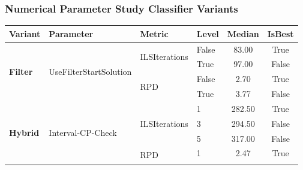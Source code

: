 \subsubsection{Numerical Parameter Study Classifier Variants}
\begin{table}[!ht]
	\tiny
	\centering
	\renewcommand{\multirowsetup}{\centering}
	\begin{tabular}{@{}l l l l c c @{}}
		\toprule
		\textbf{Variant}                      & \textbf{Parameter}                           & \textbf{Metric}                     & \textbf{Level}       & \textbf{Median} & \textbf{IsBest} \\
		\midrule
		\multirow[t]{4}{*}{\textbf{Filter}}   & \multirow[t]{4}{*}{UseFilterStartSolution}   & \multirow[t]{2}{*}{ILSIterations}   & False                & 83.00           & True            \\\cmidrule(lr){4-6}
		                                      &                                              &                                     & True                 & 97.00           & False           \\\cmidrule(lr){3-6}
		                                      &                                              & \multirow[t]{2}{*}{RPD}             & False                & 2.70            & True            \\\cmidrule(lr){4-6}
		                                      &                                              &                                     & True                 & 3.77            & False           \\\midrule
		\multirow[t]{24}{*}{\textbf{Hybrid}}  & \multirow[t]{9}{*}{Interval-CP-Check}        & \multirow[t]{3}{*}{ILSIterations}   & 1                    & 282.50          & True            \\\cmidrule(lr){4-6}
		                                      &                                              &                                     & 3                    & 294.50          & False           \\\cmidrule(lr){4-6}
		                                      &                                              &                                     & 5                    & 317.00          & False           \\\cmidrule(lr){3-6}
		                                      &                                              & \multirow[t]{3}{*}{RPD}             & 1                    & 2.47            & True            \\\cmidrule(lr){4-6}

\end{tabular}
\end{table}
